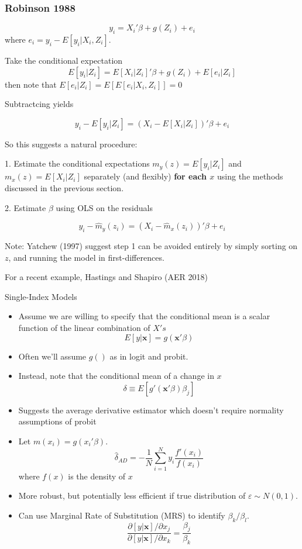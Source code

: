\begin{frame}[allowframebreaks]
  \frametitle{Robinson 1988}
  $$ y_i = X_i'\beta + g(Z_i) + e_i $$ 
  where $e_i = y_i - E[y_i | X_i,Z_i]$. 
  
  Take the conditional expectation
  $$ E[y_i | Z_i]  = E [X_i | Z_i]'\beta + g(Z_i) + E[e_i | Z_i] $$ 
  then note that $E[e_i | Z_i] = E[E[e_i | X_i,Z_i]] = 0$ 

  Subtractcing yields 

  $$ y_i - E[y_i | Z_i] = (X_i - E [X_i | Z_i])'\beta + e_i $$

  \framebreak 

  So this suggests a natural procedure: 

  1. Estimate the conditional expectations $m_y(z) = E[y_i | Z_i]$ and $m_x(z) = E[X_i | Z_i]$ separately (and flexibly) \textbf{for each $x$} using the methods discussed in the previous section. 

  2. Estimate $\beta$ using OLS on the residuals 
  
  $$y_i - \hat m_y(z_i) =  (X_i - \hat m_x(z_i))'\beta + e_i $$

  \pause 

  Note: Yatchew (1997) suggest step 1 can be avoided entirely by simply sorting on $z$, and running the model in first-differences. 

  For a recent example, Hastings and Shapiro (AER 2018)
\end{frame}

\begin{frame}[allowframebreaks]{Single-Index Models}
   
  \begin{itemize}
  \item Assume we are willing to specify that the conditional mean is a scalar function of the linear combination of $X's$ 
  $$ E \left[ y | \mathbf{x} \right] = g(\mathbf{x}'\beta ) $$ 
  \item Often we'll assume $g()$ as in logit and probit. 
  \item Instead, note that the conditional mean of a change in $x$ 
  $$ \delta \equiv E \left[g'(\mathbf{x}'\beta ) \beta_j \right] $$ 
  
  \item Suggests the \alert{average derivative estimator} which doesn't require normality assumptions of probit
  \item Let $m(x_i) = g(x_i'\beta)$. 
  $$ \hat \delta_{AD} = -\frac{1}{N} \sum_{i=1}^N y_i \frac{f'(x_i)}{f(x_i)} $$
  where $f(x)$ is the density of $x$

  \item More robust, but potentially less efficient if true distribution of $\varepsilon \sim N(0,1)$.
 
  \item Can use Marginal Rate of Substitution (MRS) to identify $\beta_k / \beta_l$.
  $$ \frac{ \partial \left[ y | \mathbf{x} \right] / \partial x_j }{ \partial \left[ y | \mathbf{x} \right] / \partial x_k} = \frac{\beta_j}{\beta_k} $$ 
  
   \end{itemize}
\end{frame}

